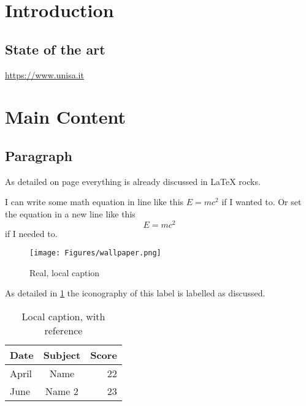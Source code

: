 \documentclass{article}
\begin{document}
\setcounter{page}{1}
\section{Introduction}\label{sec:intro}
\subsection{State of the art}
\url{https://www.unisa.it}

\section{Main Content}\label{sec:soa}
\subsection{Paragraph}\label{sec:par1}

As detailed on page \pageref{sec:intro} everything is already
discussed in \textcite{test} \LaTeX{} rocks.

I can write some math equation in line like this $E=mc^2$ if I wanted to.
Or set the equation in a new line like this $$E=mc^2$$ if I needed to.

\begin{figure}[H]
    \centering
    \texttt{[image: Figures/wallpaper.png]}
    \caption[Optional caption]{Real, local caption}
    \label{fig:fig1}
\end{figure}
As detailed in \ref{fig:fig1} the iconography of this label is labelled
as discussed.

\begin{table}[H]
    \centering
    \label{tab:table1}
    \caption[This is optional caption, without reference]{Local caption, with reference}
    \begin{tabular}{ l c r }
        \bfseries{Date} & Subject & Score \\ \hline
        April & Name & 22 \\
        June & Name 2 & 23
    \end{tabular}
\end{table}

\cleardoublepage
\printbibliography
{}
\cleardoublepage

\appendix
\thispagestyle{empty}
\end{document}
